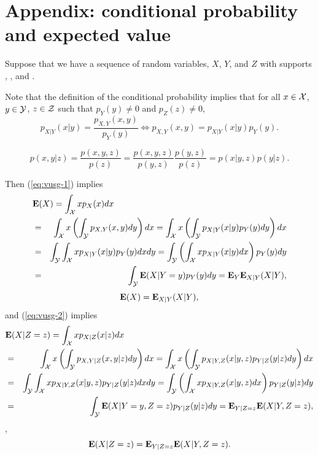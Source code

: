 \newpage
\section{Appendix: conditional probability and expected value}
\label{sec:rl-app}


Suppose that we have a sequence of random variables, $X$, $Y$, and $Z$
with supports \suppx, \suppy, and \suppz.

Note that the definition of the conditional probability implies that
for all $x\in\mathcal{X}$, $y\in\mathcal{Y}$, $z\in\mathcal{Z}$ such that $p_Y(y)\neq0$ and $p_Z(z)\neq 0$,
\begin{equation}
\label{eq:vusg-1}
p_{X|Y}(x|y)
= \frac{p_{X,Y}(x,y)}{p_Y(y)}
\Leftrightarrow
p_{X,Y}(x,y) = p_{X|Y}(x|y) p_Y(y).
\end{equation}


\begin{equation}
\label{eq:vusg-2}
p(x,y|z)
= \frac{p(x,y,z)}{p(z)}
= \frac{p(x,y,z)}{p(y,z)} \frac{p(y,z)}{p(z)}
= p(x|y,z) p(y|z).
\end{equation}

Then (\ref{eq:vusg-1}) implies
\begin{eqnarray*}
\lefteqn{
\Expect(X)
= \int_\suppx x p_X(x) dx
}
\\
&=& \int_\suppx x \left(\int_\suppy p_{X,Y}(x,y) dy \right) dx
= \int_\suppx x \left(\int_\suppy p_{X|Y}(x|y)p_Y(y) dy \right) dx
\\
&=& \int_\suppy \int_\suppx x p_{X|Y}(x|y)p_Y(y) dx dy
= \int_\suppy \left( \int_\suppx x p_{X|Y}(x|y) dx \right) p_Y(y) dy
\\
&=& \int_\suppy \Expect (X|Y=y) p_Y(y) dy
= \Expect_Y \Expect_{X|Y} (X|Y),
\end{eqnarray*}
\begin{equation}
\mathbf{E}(X) = \mathbf{E}_{X|Y} (X|Y),
\end{equation}
and (\ref{eq:vusg-2}) implies
\begin{eqnarray*}
\lefteqn{
\Expect(X|Z=z)
= \int_\suppx x p_{X|Z}(x|z) dx
}
\\
&=& \int_\suppx x \left(\int_{\suppy} p_{X,Y|Z}(x,y|z) dy \right) dx
= \int_\suppx x \left(\int_{\suppy} p_{X|Y,Z}(x|y,z) p_{Y|Z}(y|z) dy \right) dx
\\
&=& \int_\suppy \int_\suppx x p_{X|Y,Z}(x|y,z) p_{Y|Z}(y|z) dx dy
= \int_\suppy \left( \int_\suppx x p_{X|Y,Z}(x|y,z) dx \right) p_{Y|Z}(y|z) dy
\\
&=& \int_\suppy \Expect(X|Y=y,Z=z) p_{Y|Z}(y|z) dy
= \Expect_{Y|Z=z} \Expect(X|Y,Z=z),
\end{eqnarray*}
\ie,
\begin{equation}
\label{eq:dkci}
\mathbf{E}(X|Z=z)
= \mathbf{E}_{Y|Z=z} \mathbf{E}(X|Y,Z=z).
\end{equation}

